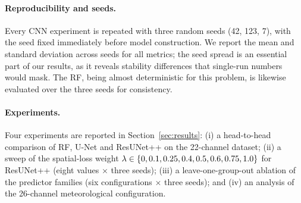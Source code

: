 \paragraph{Reproducibility and seeds.}
Every CNN experiment is repeated with three random seeds (42, 123, 7), with the
seed fixed immediately before model construction. We report the mean and
standard deviation across seeds for all metrics; the seed spread is an
essential part of our results, as it reveals stability differences that
single-run numbers would mask. The RF, being almost deterministic for this
problem, is likewise evaluated over the three seeds for consistency.

\paragraph{Experiments.}
Four experiments are reported in Section~\ref{sec:results}:
(i) a head-to-head comparison of RF, U-Net and ResUNet++ on the 22-channel
dataset;
(ii) a sweep of the spatial-loss weight $\lambda\in\{0,0.1,0.25,0.4,0.5,0.6,
0.75,1.0\}$ for ResUNet++ (eight values $\times$ three seeds);
(iii) a leave-one-group-out ablation of the predictor families (six
configurations $\times$ three seeds); and
(iv) an analysis of the 26-channel meteorological configuration.
